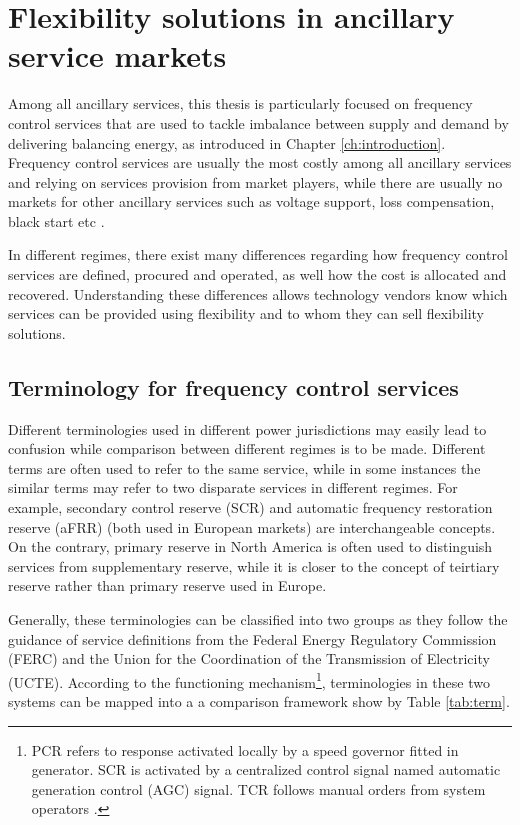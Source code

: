 \section[Flexibility solutions in ancillary service markets]{Flexibility solutions in ancillary service markets%
	}
\label{sec:market-as}
Among all ancillary services, this thesis is particularly focused on frequency control services that are used to tackle imbalance between supply and demand by delivering balancing energy, as introduced in Chapter \ref{ch:introduction}. Frequency control services are usually the most costly among all ancillary services and relying on services provision from market players, while there are usually no markets for other ancillary services such as voltage support, loss compensation, black start etc \cite{Rebours2009,Cochran2013}. 

In different regimes, there exist many differences regarding how frequency control services are defined, procured and operated, as well how the cost is allocated and recovered. Understanding these differences allows technology vendors know which services can be provided using flexibility and to whom they can sell flexibility solutions.

\subsection{Terminology for frequency control services}
Different terminologies used in different power jurisdictions may easily lead to confusion while comparison between different regimes is to be made. Different terms are often used to refer to the same service, while in some instances the similar terms may refer to two disparate services in different regimes. For example, secondary control reserve (SCR) and automatic frequency restoration reserve (aFRR) (both used in European markets) are interchangeable concepts. On the contrary, primary reserve in North America is often used to distinguish services from supplementary reserve, while it is closer to the concept of teirtiary reserve rather than primary reserve used in Europe.

Generally, these terminologies can be classified into two groups as they follow the guidance of service definitions from the Federal Energy Regulatory Commission (FERC) and the Union for the Coordination of the Transmission of Electricity (UCTE). According to the functioning mechanism\footnote{ PCR refers to response activated locally by a speed governor fitted in generator. SCR is activated by a centralized control signal named automatic generation control (AGC) signal. TCR follows manual orders from system operators \cite{EllisonJ.F.TesfatsionL.S.LooseV.W.Byrne2012}. }, terminologies in these two systems can be mapped into a a comparison framework show by Table \ref{tab:term}.

